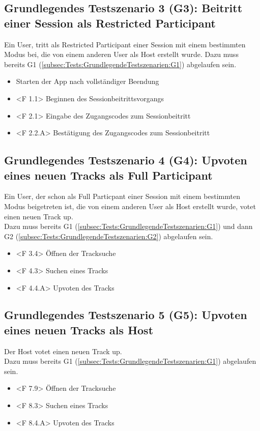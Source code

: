 \documentclass[oneside, ngerman]{sdqtechreport}
\begin{document}
\subsection{Grundlegendes Testszenario 3 (G3): Beitritt einer Session als Restricted Participant}
\label{subsec:Tests:GrundlegendeTestszenarien:G3}
Ein User, tritt als Restricted Participant einer Session mit einem bestimmten Modus bei, die von einem anderen User als Host erstellt wurde.
Dazu muss bereits G1 (\ref{subsec:Tests:GrundlegendeTestszenarien:G1}) abgelaufen sein.
\begin{itemize}
    \item <F 101> Starten der App nach vollständiger Beendung
    \item <F 1.1> Beginnen des Sessionbeitrittsvorgangs
    \item <F 2.1> Eingabe des Zugangscodes zum Sessionbeitritt
    \item <F 2.2.A> Bestätigung des Zugangscodes zum Sessionbeitritt
\end{itemize}

\subsection{Grundlegendes Testszenario 4 (G4): Upvoten eines neuen Tracks als Full Participant}
\label{subsec:Tests:GrundlegendeTestszenarien:G4}
Ein User, der schon als Full Particpant einer Session mit einem bestimmten Modus beigetreten ist, die von einem anderen User als Host erstellt wurde, votet einen neuen Track up. \\
Dazu muss bereits G1 (\ref{subsec:Tests:GrundlegendeTestszenarien:G1}) und dann G2 (\ref{subsec:Tests:GrundlegendeTestszenarien:G2}) abgelaufen sein.
\begin{itemize}
    \item <F 3.4> Öffnen der Tracksuche
    \item <F 4.3> Suchen eines Tracks
    \item <F 4.4.A> Upvoten des Tracks
\end{itemize}

\subsection{Grundlegendes Testszenario 5 (G5): Upvoten eines neuen Tracks als Host}
\label{subsec:Tests:GrundlegendeTestszenarien:G5}
Der Host votet einen neuen Track up. \\
Dazu muss bereits G1 (\ref{subsec:Tests:GrundlegendeTestszenarien:G1}) abgelaufen sein.
\begin{itemize}
    \item <F 7.9> Öffnen der Tracksuche
    \item <F 8.3> Suchen eines Tracks
    \item <F 8.4.A> Upvoten des Tracks
\end{itemize}
\end{document}
